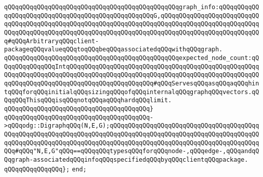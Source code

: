 \verb|qQQqqQQqqQQqqQQqqQQqqQQqqQQqqQQqqQQqqQQqqQQqqQQqgraph_info:qQQqqQQqqQQqqQQqqQQqqQQqqQQqqQQqqQQqqQQqqQQqqQQqqQQqG,qQQqqQQqqQQqqQQqqQQqqQQqqQQqqQQqqQQqqQQqqQQqqQQqqQQqqQQqqQQqqQQqqQQqqQQqqQQqqQQqqQQqqQQqqQQqqQQqqQQqqQQqqQQqqQQqqQQqqQQqqQQqqQQqqQQqqQQqqQQqqQQqqQQqqQQqqQQqqQQqqQQqqQQq#qQQqArbitraryqQQqclient-packageqQQqvalueqQQqtoqQQqbeqQQqassociatedqQQqwithqQQqgraph.|\newline
\verb|qQQqqQQqqQQqqQQqqQQqqQQqqQQqqQQqqQQqqQQqqQQqqQQqexpected_node_count:qQQqqQQqqQQqqQQqIntqQQqqQQqqQQqqQQqqQQqqQQqqQQqqQQqqQQqqQQqqQQqqQQqqQQqqQQqqQQqqQQqqQQqqQQqqQQqqQQqqQQqqQQqqQQqqQQqqQQqqQQqqQQqqQQqqQQqqQQqqQQqqQQqqQQqqQQqqQQqqQQqqQQqqQQqqQQqqQQqqQQq#qQQqServesqQQqasqQQqaqQQqhintqQQqforqQQqinitialqQQqsizingqQQqofqQQqinternalqQQqgraphqQQqvectors.qQQqqQQqThisqQQqisqQQqnotqQQqaqQQqhardqQQqlimit.|\newline
\verb|qQQqqQQqqQQqqQQqqQQqqQQqqQQqqQQqqQQqqQQq}|\newline
\verb|qQQqqQQqqQQqqQQqqQQqqQQqqQQqqQQqqQQqqQQq->qQQqodg::DigraphqQQq(N,E,G);qQQqqQQqqQQqqQQqqQQqqQQqqQQqqQQqqQQqqQQqqQQqqQQqqQQqqQQqqQQqqQQqqQQqqQQqqQQqqQQqqQQqqQQqqQQqqQQqqQQqqQQqqQQqqQQqqQQqqQQqqQQqqQQqqQQqqQQqqQQqqQQqqQQqqQQqqQQqqQQqqQQqqQQqqQQqqQQqqQQqqQQq#qQQq"N,E,G"qQQq==qQQqqQQqtypesqQQqforqQQqnode-,qQQqedge-,qQQqandqQQqgraph-associatedqQQqinfoqQQqspecifiedqQQqbyqQQqclientqQQqpackage.|\newline
\verb|qQQqqQQqqQQqqQQq};|\newline
\newline
\verb|end;|\newline


